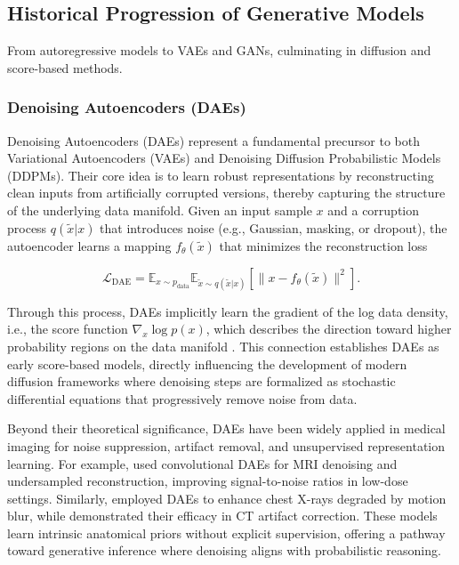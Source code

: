 \subsection{Historical Progression of Generative Models}
\label{subsec:history}
From autoregressive models to VAEs and GANs, culminating in diffusion and score-based methods.
\subsubsection{Denoising Autoencoders (DAEs)}
Denoising Autoencoders (DAEs) \cite{vincent2008dae} represent a fundamental precursor to both Variational Autoencoders (VAEs) and Denoising Diffusion Probabilistic Models (DDPMs). Their core idea is to learn robust representations by reconstructing clean inputs from artificially corrupted versions, thereby capturing the structure of the underlying data manifold. Given an input sample \( x \) and a corruption process \( q(\tilde{x}|x) \) that introduces noise (e.g., Gaussian, masking, or dropout), the autoencoder learns a mapping \( f_\theta(\tilde{x}) \) that minimizes the reconstruction loss  

\begin{equation}
    \mathcal{L}_{\text{DAE}} = 
    \mathbb{E}_{x \sim p_{\text{data}}}
    \mathbb{E}_{\tilde{x} \sim q(\tilde{x}|x)}
    \left[ \| x - f_\theta(\tilde{x}) \|^2 \right].
\end{equation}

Through this process, DAEs implicitly learn the gradient of the log data density, i.e., the score function \( \nabla_x \log p(x) \), which describes the direction toward higher probability regions on the data manifold \cite{alain2014score}. This connection establishes DAEs as early score-based models, directly influencing the development of modern diffusion frameworks where denoising steps are formalized as stochastic differential equations that progressively remove noise from data.  

\vspace{1em}

Beyond their theoretical significance, DAEs have been widely applied in medical imaging for noise suppression, artifact removal, and unsupervised representation learning. For example, \cite{chen2019dae_mri} used convolutional DAEs for MRI denoising and undersampled reconstruction, improving signal-to-noise ratios in low-dose settings. Similarly, \cite{xu2020dae_cxr} employed DAEs to enhance chest X-rays degraded by motion blur, while \cite{li2021dae_ct} demonstrated their efficacy in CT artifact correction. These models learn intrinsic anatomical priors without explicit supervision, offering a pathway toward generative inference where denoising aligns with probabilistic reasoning.  

